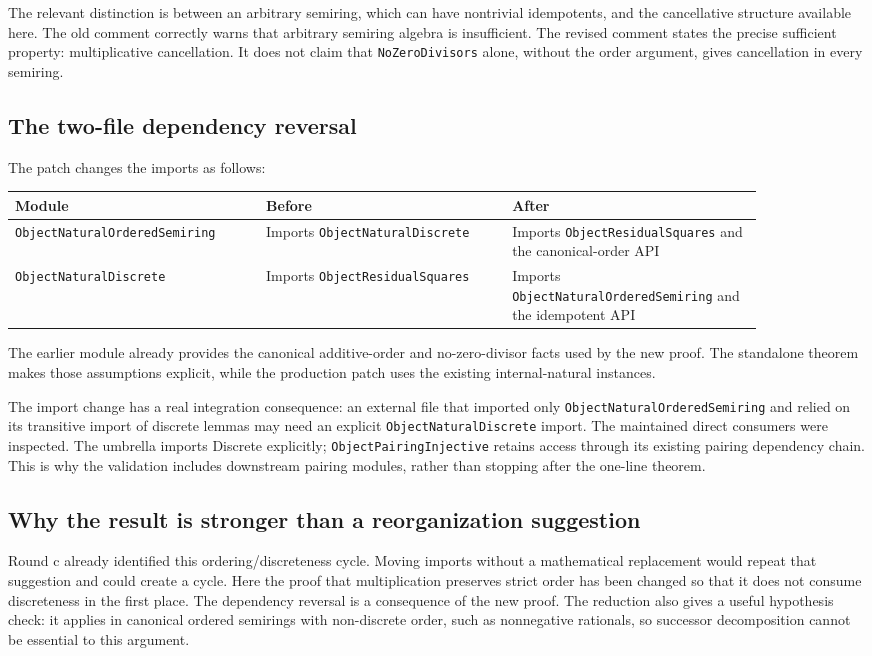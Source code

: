\documentclass[11pt,letterpaper]{article}
\newcommand{\code}[1]{\nolinkurl{#1}}
\begin{document}
The relevant distinction is between an arbitrary semiring, which can have nontrivial idempotents, and the cancellative structure available here. The old comment correctly warns that arbitrary semiring algebra is insufficient. The revised comment states the precise sufficient property: multiplicative cancellation. It does not claim that \code{NoZeroDivisors} alone, without the order argument, gives cancellation in every semiring.

\subsection{The two-file dependency reversal}
The patch changes the imports as follows:
\begin{center}
\begin{tabular}{p{0.29\linewidth}p{0.29\linewidth}p{0.29\linewidth}}
\toprule
Module & Before & After\\
\midrule
\code{ObjectNaturalOrderedSemiring} & Imports \code{ObjectNaturalDiscrete} & Imports \code{ObjectResidualSquares} and the canonical-order API\\
\code{ObjectNaturalDiscrete} & Imports \code{ObjectResidualSquares} & Imports \code{ObjectNaturalOrderedSemiring} and the idempotent API\\
\bottomrule
\end{tabular}
\end{center}
The earlier module already provides the canonical additive-order and no-zero-divisor facts used by the new proof. The standalone theorem makes those assumptions explicit, while the production patch uses the existing internal-natural instances.

The import change has a real integration consequence: an external file that imported only \code{ObjectNaturalOrderedSemiring} and relied on its transitive import of discrete lemmas may need an explicit \code{ObjectNaturalDiscrete} import. The maintained direct consumers were inspected. The umbrella imports Discrete explicitly; \code{ObjectPairingInjective} retains access through its existing pairing dependency chain. This is why the validation includes downstream pairing modules, rather than stopping after the one-line theorem.

\subsection{Why the result is stronger than a reorganization suggestion}
Round c already identified this ordering/discreteness cycle. Moving imports without a mathematical replacement would repeat that suggestion and could create a cycle. Here the proof that multiplication preserves strict order has been changed so that it does not consume discreteness in the first place. The dependency reversal is a consequence of the new proof. The reduction also gives a useful hypothesis check: it applies in canonical ordered semirings with non-discrete order, such as nonnegative rationals, so successor decomposition cannot be essential to this argument.
\end{document}
